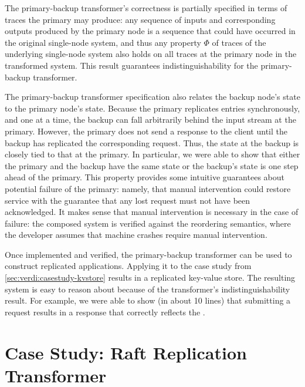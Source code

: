 The primary-backup transformer's correctness is partially specified in
terms of traces the primary may produce: any sequence of inputs and
corresponding outputs produced by the primary node is a sequence that could
have occurred in the original single-node system, and thus any property
$\Phi$ of traces of the underlying single-node system also holds on all
traces at the primary node in the transformed system. This result
guarantees indistinguishability for the primary-backup transformer.

The primary-backup transformer specification also relates the backup node's
state to the primary node's state. Because the primary replicates entries
synchronously, and one at a time, the backup can fall arbitrarily behind
the input stream at the primary. However, the primary does not send a
response to the client until the backup has replicated the corresponding
request. Thus, the state at the backup is closely tied to that at the
primary. In particular, we were able to show that either the primary and
the backup have the same state or the backup's state is one step ahead of
the primary.  This property provides some intuitive guarantees about
potential failure of the primary: namely, that manual intervention could
restore service with the guarantee that any lost request must not have been
acknowledged. It makes sense that manual intervention is necessary in the
case of failure: the composed system is verified against the reordering
semantics, where the developer assumes that machine crashes require manual
intervention.


Once implemented and verified, the primary-backup transformer can be used
to construct replicated applications. Applying it to the case study from
\cref{sec:verdi:casestudy-kvstore} results in a replicated key-value store. The
resulting system is easy to reason about because of the transformer's
indistinguishability result. For example, we were able to show (in
about 10 lines) that submitting a \putk request results in a response that
correctly reflects the \putk.

\section{Case Study: Raft Replication Transformer}
\label{sec:verdi:casestudy-raft}

